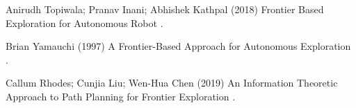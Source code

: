 \documentclass{article}
\begin{document}
  


\begin{thebibliography}{1}


 Anirudh Topiwala; Pranav Inani; Abhishek Kathpal
\newblock (2018)
\newblock Frontier Based Exploration for Autonomous Robot
.

 \bibitem{}
Brian Yamauchi
\newblock (1997)
\newblock  A Frontier-Based Approach for Autonomous Exploration
.

Callum Rhodes; Cunjia Liu; Wen-Hua Chen
\newblock (2019)
\newblock An Information Theoretic Approach to Path Planning for Frontier Exploration
.



\end{thebibliography}


\end{document}
